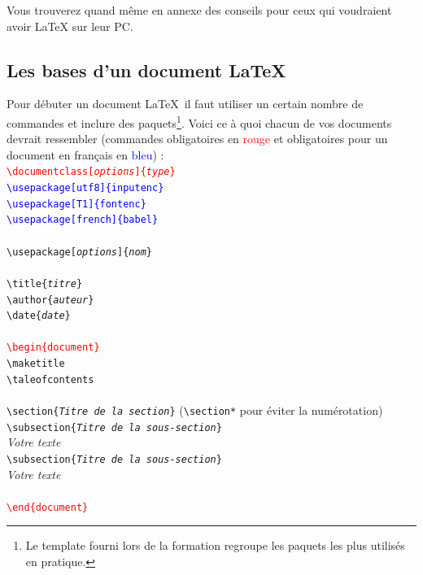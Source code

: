 \documentclass[11pt]{article}				%
\newcommand{\tb}{\textbackslash}
\begin{document}
Vous trouverez quand même en annexe des conseils pour ceux qui voudraient avoir LaTeX sur leur PC.

\subsection{Les bases d'un document \LaTeX}


\noindent Pour débuter un document \LaTeX \ il faut utiliser un certain nombre de commandes et inclure des paquets\footnote{Le template fourni lors de la formation regroupe les paquets les plus utilisés en pratique.}. Voici ce à quoi chacun de vos documents devrait ressembler (commandes obligatoires en \textcolor{red}{rouge} et obligatoires pour un document en français en \textcolor{blue}{bleu}) : \\

\noindent
\textcolor{red}{\texttt{\tb documentclass[\textit{options}]\{\textit{type}\}}} \\
\textcolor{blue}{\texttt{\tb usepackage[utf8]\{inputenc\}}} \\
\textcolor{blue}{\texttt{\tb usepackage[T1]\{fontenc\}}} \\
\textcolor{blue}{\texttt{\tb usepackage[french]\{babel\}}} \\
~\\
\texttt{\tb usepackage[\textit{options}]\{\textit{nom}\}} \\
~\\ 
\texttt{\tb title\{\textit{titre}\}} \\
\texttt{\tb author\{\textit{auteur}\}} \\
\texttt{\tb date\{\textit{date}\}} \\
~\\ 
\textcolor{red}{\texttt{\tb begin\{document\}}}\\
\texttt{\tb maketitle} \\
\texttt{\tb taleofcontents} \\
~\\
\texttt{\tb section\{\textit{Titre de la section}\}} \quad (\texttt{\tb section*} pour éviter la numérotation)	 \\
\texttt{\tb subsection\{\textit{Titre de la sous-section}\}} \\
\textit{Votre texte}\\

\texttt{\tb subsection\{\textit{Titre de la sous-section}\}} \\
\textit{Votre texte} \\
~\\
\textcolor{red}{\texttt{\tb end\{document\}}} \\
\end{document}
